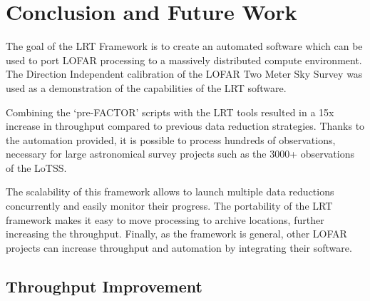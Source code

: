 % 


\section{Conclusion and Future Work}\label{sec:conclusion}

The goal of the LRT Framework is to create an automated software which can be used to port LOFAR processing to a massively distributed compute environment. The Direction Independent calibration of the LOFAR Two Meter Sky Survey was used as a demonstration of the capabilities of the LRT software. 

Combining the `pre-FACTOR' scripts with the LRT tools resulted in a 15x increase in throughput compared to previous data reduction strategies. Thanks to the automation provided, it is possible to process hundreds of observations, necessary for large astronomical survey projects such as the 3000+ observations of the LoTSS. 

The scalability of this framework allows to launch multiple data reductions concurrently and easily monitor their progress. The portability of the LRT framework makes it easy to move processing to archive locations, further increasing the throughput. Finally, as the framework is general, other LOFAR projects can increase throughput and automation by integrating their software. 


\subsection{Throughput Improvement}

